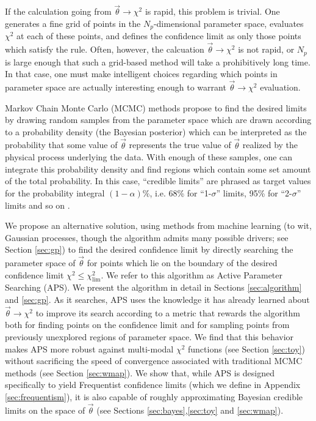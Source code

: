 \documentclass[useAMS,usenatbib]{aastex}
\begin{document}
If the calculation going from $\vec{\theta}\rightarrow\chi^2$ is rapid, this
problem is trivial.  One generates a fine grid of points in the 
$N_p$-dimensional parameter space, evaluates $\chi^2$ at each of these points, 
and defines the confidence limit as only those points which satisfy the rule.  
Often, however, the calcuation $\vec{\theta}\rightarrow\chi^2$ is not rapid, 
or $N_p$
is large enough that such a grid-based method will take a prohibitively long
time.  In that case, one must make intelligent choices regarding which points in
parameter space are actually interesting enough to warrant
 $\vec{\theta}\rightarrow\chi^2$ evaluation.

Markov Chain Monte Carlo (MCMC) methods propose to find the desired
limits by drawing random samples from the parameter space which are drawn
according to a probability density (the Bayesian posterior) which can be
interpreted as the probability that some value of $\vec{\theta}$ represents the
true value of $\vec{\theta}$ realized by the physical process underlying
the data.  
With enough of these samples, one can integrate this
probability density and find regions which contain some set amount of the total
probability.  In this case, ``credible limits'' are phrased as target values
for the probability integral $(1-\alpha)\%$, i.e. 
68\% for ``1-$\sigma$'' limits, 95\% for ``2-$\sigma$'' limits
and so on \cite{mcmc}.

We propose an alternative solution, using methods from machine learning
(to wit, Gaussian processes, though the 
algorithm admits many possible drivers; see
Section \ref{sec:gp})
to find the desired confidence limit by directly searching the
parameter space of $\vec{\theta}$ for points which lie on the boundary of the
desired confidence limit $\chi^2\le\chi^2_\text{lim}$.  
We refer to this algorithm as Active Parameter Searching (APS).
We present the algorithm in detail in Sections \ref{sec:algorithm} and
\ref{sec:gp}.
As it searches, APS uses
the knowledge it has already learned about $\vec{\theta}\rightarrow\chi^2$ 
to improve its search according to a metric that rewards the
algorithm both for finding points on the confidence limit and for sampling
points from previously unexplored regions of parameter space.  We find that this
behavior makes APS more robust against multi-modal $\chi^2$ functions (see
Section \ref{sec:toy}) without
sacrificing the speed of convergence 
associated with traditional MCMC methods (see Section \ref{sec:wmap}).
We show that, while APS is designed specifically to
yield Frequentist confidence
limits (which we define in Appendix \ref{sec:frequentism}),
it is also capable of roughly approximating
Bayesian credible limits on the space of
$\vec{\theta}$ (see Sections \ref{sec:bayes},\ref{sec:toy} and \ref{sec:wmap}).
\end{document}
